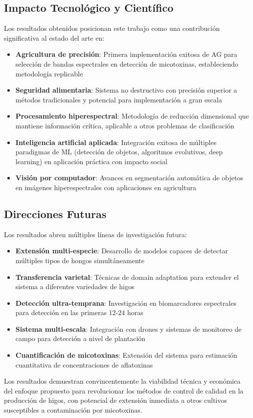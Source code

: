 \subsection{Impacto Tecnológico y Científico}

Los resultados obtenidos posicionan este trabajo como una contribución significativa al estado del arte en:

\begin{itemize}
    \item \textbf{Agricultura de precisión}: Primera implementación exitosa de AG para selección de bandas espectrales en detección de micotoxinas, estableciendo metodología replicable
    
    \item \textbf{Seguridad alimentaria}: Sistema no destructivo con precisión superior a métodos tradicionales y potencial para implementación a gran escala
    
    \item \textbf{Procesamiento hiperespectral}: Metodología de reducción dimensional que mantiene información crítica, aplicable a otros problemas de clasificación
    
    \item \textbf{Inteligencia artificial aplicada}: Integración exitosa de múltiples paradigmas de ML (detección de objetos, algoritmos evolutivos, deep learning) en aplicación práctica con impacto social
    
    \item \textbf{Visión por computador}: Avances en segmentación automática de objetos en imágenes hiperespectrales con aplicaciones en agricultura
\end{itemize}

\subsection{Direcciones Futuras}

Los resultados abren múltiples líneas de investigación futura:

\begin{itemize}
    \item \textbf{Extensión multi-especie}: Desarrollo de modelos capaces de detectar múltiples tipos de hongos simultáneamente
    
    \item \textbf{Transferencia varietal}: Técnicas de domain adaptation para extender el sistema a diferentes variedades de higos
    
    \item \textbf{Detección ultra-temprana}: Investigación en biomarcadores espectrales para detección en las primeras 12-24 horas
    
    \item \textbf{Sistema multi-escala}: Integración con drones y sistemas de monitoreo de campo para detección a nivel de plantación
    
    \item \textbf{Cuantificación de micotoxinas}: Extensión del sistema para estimación cuantitativa de concentraciones de aflatoxinas
\end{itemize}

Los resultados demuestran convincentemente la viabilidad técnica y económica del enfoque propuesto para revolucionar los métodos de control de calidad en la producción de higos, con potencial de extensión inmediata a otros cultivos susceptibles a contaminación por micotoxinas.
